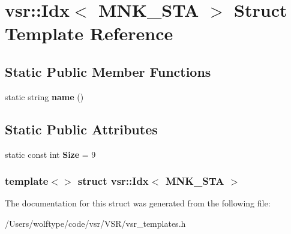 \hypertarget{structvsr_1_1_idx_3_01_m_n_k___s_t_a_01_4}{\section{vsr\-:\-:Idx$<$ M\-N\-K\-\_\-\-S\-T\-A $>$ Struct Template Reference}
\label{structvsr_1_1_idx_3_01_m_n_k___s_t_a_01_4}
}
\subsection*{Static Public Member Functions}
\begin{DoxyCompactItemize}
\item 
\hypertarget{structvsr_1_1_idx_3_01_m_n_k___s_t_a_01_4_aaad7ff775fed6c96afb9f2277f8ed787}{static string {\bfseries name} ()}\label{structvsr_1_1_idx_3_01_m_n_k___s_t_a_01_4_aaad7ff775fed6c96afb9f2277f8ed787}

\end{DoxyCompactItemize}
\subsection*{Static Public Attributes}
\begin{DoxyCompactItemize}
\item 
\hypertarget{structvsr_1_1_idx_3_01_m_n_k___s_t_a_01_4_acdc451568fb32ba21bab426afcbecf53}{static const int {\bfseries Size} = 9}\label{structvsr_1_1_idx_3_01_m_n_k___s_t_a_01_4_acdc451568fb32ba21bab426afcbecf53}

\end{DoxyCompactItemize}
\subsubsection*{template$<$$>$ struct vsr\-::\-Idx$<$ M\-N\-K\-\_\-\-S\-T\-A $>$}



The documentation for this struct was generated from the following file\-:\begin{DoxyCompactItemize}
\item 
/\-Users/wolftype/code/vsr/\-V\-S\-R/vsr\-\_\-templates.\-h\end{DoxyCompactItemize}
